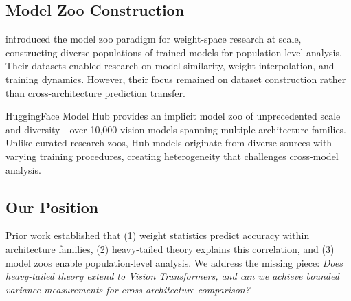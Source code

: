 \subsection{Model Zoo Construction}

\citet{schurholt2022model} introduced the model zoo paradigm for weight-space research at scale, constructing diverse populations of trained models for population-level analysis. Their datasets enabled research on model similarity, weight interpolation, and training dynamics. However, their focus remained on dataset construction rather than cross-architecture prediction transfer.

HuggingFace Model Hub \citep{huggingface2022hub} provides an implicit model zoo of unprecedented scale and diversity---over 10,000 vision models spanning multiple architecture families. Unlike curated research zoos, Hub models originate from diverse sources with varying training procedures, creating heterogeneity that challenges cross-model analysis.

\subsection{Our Position}

Prior work established that (1) weight statistics predict accuracy within architecture families, (2) heavy-tailed theory explains this correlation, and (3) model zoos enable population-level analysis. We address the missing piece: \emph{Does heavy-tailed theory extend to Vision Transformers, and can we achieve bounded variance measurements for cross-architecture comparison?}
